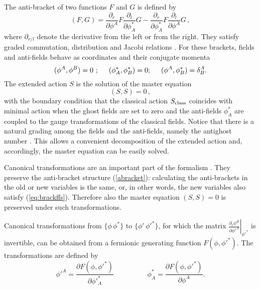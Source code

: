 \documentclass[a4paper,12pt]{article}
\begin{document}
The {anti-bracket} 
of two functions $F$ and $G$ is defined by
\begin{equation}\label{abracket}
\left( F, G \right) = 
\frac{\partial_r }{\partial\phi ^A}  F \frac{\partial_l }{\partial\phi
  ^*_A} G -  
\frac{\partial_r }{\partial\phi ^*_A} F  \frac{\partial_l
  }{\partial\phi ^A} G \, ,   
\end{equation}
where $\partial_{r/l}$ denote the derivative from the left or from the
right.  They satisfy graded commutation, distribution and Jacobi
relations \cite{BV}.  For these brackets, fields and anti-fields behave
as coordinates and their conjugate momenta
\begin{equation}\label{eq:brackffs}
(\phi^A,\phi^B)=0\ ;\hspace{0.5cm}
(\phi^*_A,\phi^*_B)=0;\hspace{0.5cm}
(\phi^A,\phi^*_B)=\delta^A_B.
\end{equation}
%
The extended action $S$ is the solution of the master equation 
\begin{equation}\label{master}
(S,S)=0\,,
\end{equation}
with the boundary condition that the classical action $S_{\rm class}$
coincides with minimal action when the ghost fields are set to zero
and the anti-fields $\phi^*_A$ are coupled to the gauge
transformations of the classical fields.  Notice that there is a
natural grading among the fields and the anti-fields, namely the
antighost number \cite{gomis}. This allows a convenient decomposition
of the extended action and, accordingly, the master equation can be
easily solved.

Canonical transformations are an important part of the formalism
\cite{cano}.  They preserve the anti-bracket structure
(\ref{abracket}): calculating the anti-brackets in the old or new
variables is the same, or, in other words, the new variables also
satisfy (\ref{eq:brackffs}). Therefore also the master
equation $(S,S)=0$ is preserved under such transformations.

Canonical transformations from $\{\phi\, \phi ^*\}$ to $\{\phi'\,
\phi'^*\}$, for which the matrix $\left. \frac{\partial_r
    \phi^B}{\partial \phi'^A}\right|_{\phi'^*}$ is invertible, can be
obtained from a fermionic generating function $F(\phi,\phi'^*)$. The
transformations are defined by
\begin{equation} \phi'^A=\frac{\partial F(\phi , \phi'^*)
}{\partial \phi'^*_A}\hspace{2cm}
\phi^*_A=\frac{\partial F(\phi , \phi'^*)}{\partial \phi ^A}.
\label{Fcan}\end{equation}
\end{document}
